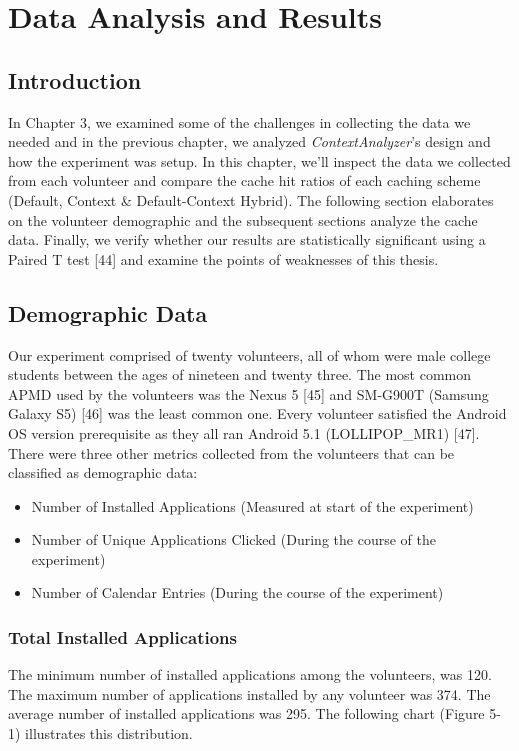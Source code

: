 \documentclass[12pt]{uthesis-v12}  %
\begin{document}
\chapter{Data Analysis and Results}

		\section{Introduction}
			In Chapter 3, we examined some of the challenges in collecting the data we needed and in the previous chapter, we analyzed {\em ContextAnalyzer}'s design and how the experiment was setup. In this chapter, we'll inspect the data we collected from each volunteer and compare the cache hit ratios of each caching scheme (Default, Context \& Default-Context Hybrid). The following section elaborates on the volunteer demographic and the subsequent sections analyze the cache data. Finally, we verify whether our results are statistically significant using a Paired T test [44] and examine the points of weaknesses of this thesis.
			
		\section{Demographic Data}
			Our experiment comprised of twenty volunteers, all of whom were male college students between the ages of nineteen and twenty three. The most common APMD used by the volunteers was the Nexus 5 [45] and SM-G900T (Samsung Galaxy S5) [46] was the least common one. Every volunteer satisfied the Android OS version prerequisite as they all ran Android 5.1 (LOLLIPOP\_MR1) [47]. There were three other metrics  collected from the volunteers that can be classified as demographic data:
			
			\begin{itemize}
				\item Number of Installed Applications (Measured at start of the experiment)
				\item Number of Unique Applications Clicked (During the course of the experiment)
				\item Number of Calendar Entries (During the course of the experiment)
			\end{itemize} 
			
			\subsection{Total Installed Applications}
				The minimum number of installed applications among the volunteers, was 120. The maximum number of applications installed by any volunteer was 374. The average number of installed applications was 295. The following chart (Figure 5-1) illustrates this distribution.
				
\end{document}
